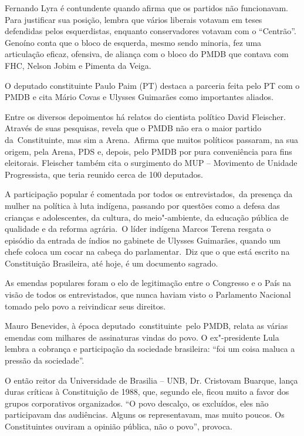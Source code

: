 Fernando Lyra é contundente quando afirma que os partidos não
funcionavam. Para justificar sua posição, lembra que vários liberais
votavam em teses defendidas pelos esquerdistas, enquanto conservadores
votavam com o ``Centrão''. Genoíno conta que o bloco de esquerda, mesmo
sendo minoria, fez uma articulação eficaz, ofensiva, de aliança com o
bloco do PMDB que contava com FHC, Nelson Jobim e Pimenta da Veiga.

O deputado constituinte Paulo Paim (PT) destaca a parceria feita pelo PT
com o PMDB e cita Mário Covas e Ulysses Guimarães como importantes
aliados.

Entre os diversos depoimentos há relatos do cientista político David
Fleischer. Através de suas pesquisas, revela que o PMDB não era o maior
partido da~Constituinte, mas sim a Arena.~Afirma que muitos políticos
passaram, na sua origem, pela Arena, PDS e, depois, pelo PMDB por pura
conveniência para fins eleitorais. Fleischer também cita o surgimento do
MUP -- Movimento de Unidade Progressista, que teria reunido cerca de 100
deputados.

A participação popular é comentada por todos os entrevistados,~da
presença da mulher na política à luta indígena, passando por questões
como a defesa das crianças e adolescentes, da cultura, do meio"-ambiente,
da educação pública de qualidade e da reforma agrária.~O líder indígena
Marcos Terena resgata o episódio da entrada de índios no gabinete de
Ulysses Guimarães, quando um chefe coloca um cocar na cabeça do
parlamentar.~Diz que o que está escrito na Constituição Brasileira, até
hoje, é um documento sagrado.

As emendas populares foram o elo de legitimação entre o Congresso e o
País na visão de todos os entrevistados, que nunca haviam visto o
Parlamento Nacional tomado pelo povo a reivindicar seus direitos.

Mauro Benevides, à época deputado~constituinte~pelo PMDB, relata as
várias emendas com milhares de assinaturas vindas do povo. O
ex"-presidente Lula lembra a cobrança e participação da sociedade
brasileira: ``foi um coisa maluca a pressão da sociedade''.

O então reitor da Universidade de Brasilia -- UNB, Dr. Cristovam
Buarque, lança duras críticas à Constituição de 1988, que, segundo ele,
ficou muito a favor dos grupos corporativos organizados. ``O povo
descalço, os excluídos, eles não participavam das audiências. Alguns os
representavam, mas muito poucos. Os Constituintes ouviram a opinião
pública, não o povo'', provoca.

